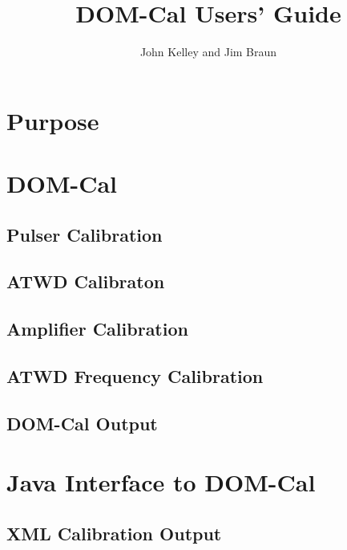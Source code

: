 \documentclass[10pt]{article}
\begin{document}
                                                                                
\baselineskip=16pt
\def\Z{{\bf Z}}
                                                                                
\newcommand{\infinity}{\infty}
                                                                                
\title{DOM-Cal Users' Guide}
\author{John Kelley and Jim Braun}
\maketitle
                                                                                
\newpage

\section{Purpose}

\section{DOM-Cal}

\subsection{Pulser Calibration}

\subsection{ATWD Calibraton}

\subsection{Amplifier Calibration}

\subsection{ATWD Frequency Calibration}

\subsection{DOM-Cal Output}

\section{Java Interface to DOM-Cal}

\subsection{XML Calibration Output}
\end{document}
